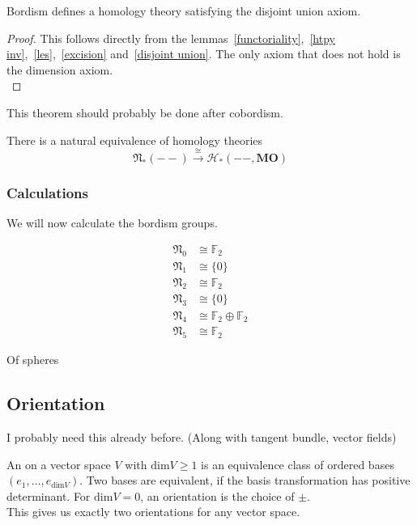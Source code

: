 \documentclass[a4paper,11pt]{article}
\begin{document}
\begin{theorem}
    Bordism defines a homology theory satisfying the disjoint union axiom.
\end{theorem}

\begin{proof}
    This follows directly from the lemmas\ \ref{functoriality},\ \ref{htpy inv},\ \ref{les},\ \ref{excision} and\ \ref{disjoint union}.
    The only axiom that does not hold is the dimension axiom.\\
\end{proof}


This theorem should probably be done after cobordism.
\begin{theorem}
    There is a natural equivalence of homology theories
    \[\mathfrak{N}_\ast(--)\xrightarrow{\cong}\mathcal{H}_\ast(--,\mathbf{MO})\]
\end{theorem}

\subsubsection{Calculations}

We will now calculate the bordism groups.

\begin{align*}
    \mathfrak N_0 &\cong \mathbb F_2\\
    \mathfrak N_1 &\cong \{0\}\\
    \mathfrak N_2 &\cong \mathbb F_2\\
    \mathfrak N_3 &\cong \{0\}\\
    \mathfrak N_4 &\cong \mathbb F_2\oplus\mathbb F_2\\
    \mathfrak N_5 &\cong \mathbb F_2
\end{align*}

Of spheres

\subsection{Orientation}

\begin{definition}
\end{definition}
I probably need this already before. (Along with tangent bundle, vector fields)

\begin{definition}
    An  on a vector space \(V\) with \(\mathrm{dim} V\geq 1\) is an equivalence class of ordered bases \((e_1,\dots,e_{\mathrm{dim}V})\). Two bases are equivalent, if the basis transformation has positive determinant. For \(\mathrm{dim}V=0\), an orientation is the choice of \(\pm\).\\
    This gives us exactly two orientations for any vector space.
\end{definition}
\end{document}
